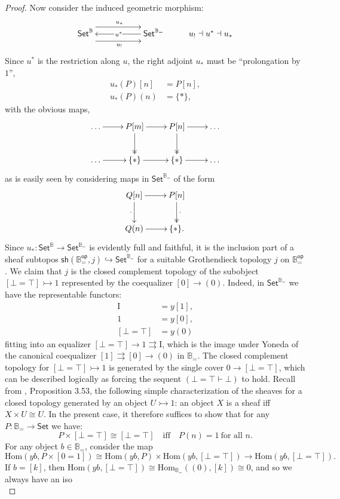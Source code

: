 \documentclass[12pt]{article}
\newcommand{\B}{\ensuremath{\mathbb{B}}}
\newcommand{\Set}{\ensuremath{\mathsf{Set}}}
\renewcommand{\hom}{\ensuremath{\mathrm{Hom}}}
\newcommand{\hook}{\ensuremath{\hookrightarrow}}
\newcommand{\mono}{\ensuremath{\rightarrowtail}}
\renewcommand{\to}{\ensuremath{\rightarrow}}
\newcommand{\I}{\ensuremath{\mathrm{I}}}
\theoremstyle{remark}
\theoremstyle{definition}
\begin{document}
\begin{proof}
Now consider the induced geometric morphism:
\[
\xymatrix{
\Set^\B \ar@<-2ex>[rr]_{u_!} \ar@<2ex>[rr]^{u_*} && \ar[ll]|-{\,u^*} \Set^{\B_=}  & u_! \dashv u^* \dashv u_*
}
\]
Since $u^*$ is the restriction along $u$, the right adjoint $u_*$ must be ``prolongation by $1$'',
\begin{align*}
u_*(P)[n] &= P[n],\\
u_*(P)(n) &= \{*\},
\end{align*}
with the obvious maps,
\[
\xymatrix{
\dots \ar[r] & P[m] \ar@{->>}[d] \ar[r] & P[n] \ar@{->>}[d] \ar[r] & \dots \\
\dots \ar[r] & \{*\} \ar[r] & \{*\} \ar[r] & \dots
}
\]
as is easily seen by considering maps in $\Set^{\B_=}$ of the form
\[
\xymatrix{
 Q[n] \ar[d]_{\cdot} \ar[r] & P[n] \ar@{->>}[d]^{\cdot} \\
 Q(n) \ar[r]^{} & \{*\} .
}
\]
Since $u_* : \Set^{\B} \to \Set^{\B_=}$ is evidently full and faithful, it is the inclusion part of a sheaf subtopos $\mathsf{sh}(\B^\mathsf{op}_=, j) \hook \Set^{\B_=}$ for a suitable Grothendieck topology $j$ on $\B^\mathsf{op}_=$.  We claim that $j$ is the closed complement topology of the subobject $[\bot=\top] \rightarrowtail 1$ represented by the coequalizer $[0]\to (0)$.  Indeed, in $\Set^{\B_=}$ we have the representable functors:
\begin{align*}
\I &= y[1],\\
1 &= y[0],\\
[\bot=\top] &= y(0)
\end{align*}
fitting into an equalizer $[\bot=\top] \to 1 \rightrightarrows \I$, which is the image under Yoneda of the canonical coequalizer $[1] \rightrightarrows [0]\to (0)$ in $\B_=$.  The closed complement topology for $[\bot=\top] \mono 1$ is generated by the single cover $0\to [\bot=\top]$, which can be described logically as 
forcing the sequent $(\bot=\top \vdash \bot)$ to hold.  Recall from \cite{JohnstoneTT}, Proposition 3.53, the following simple characterization of the sheaves for a closed topology generated by an object $U\mono 1$: an object $X$ is a sheaf iff $X\times U \cong U$. In the present case, it therefore suffices to show that for any $P:\B_= \to \Set$ we have:
\[
P\times [\bot=\top] \cong [\bot=\top] \quad\text{iff}\quad P(n) = 1\ \text{for all $n$}.
\]
For any object $b\in \B_=$, consider the map
\[
\hom(yb, P\times [0=1] ) \cong \hom(yb, P) \times \hom(yb, [\bot=\top]) \to \hom(yb, [\bot=\top]) .
\]
If $b = [k]$, then $\hom(yb, [\bot=\top]) \cong \hom_{\B_=}((0), [k]) \cong 0$, and so we always have an iso
\[
\]
\end{proof}
\end{document}
